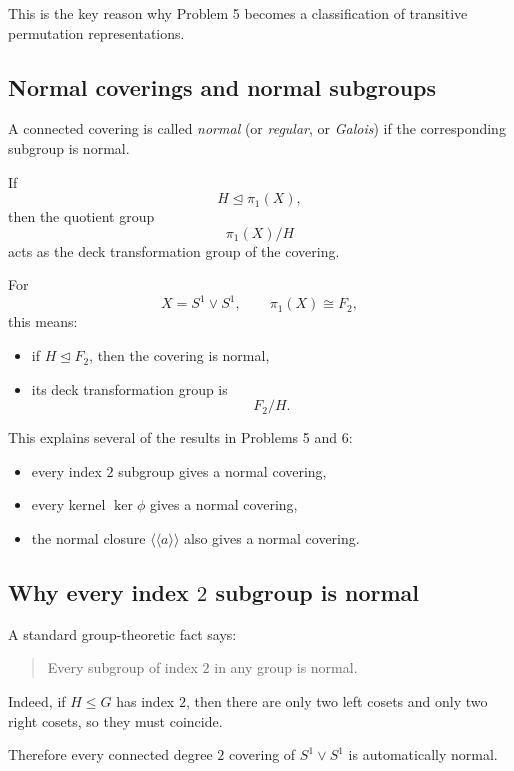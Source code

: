 \documentclass[12pt,a4paper]{article}
\theoremstyle{notespace}
\begin{document}
This is the key reason why Problem 5 becomes a classification of transitive permutation representations.

\bigskip

\subsection{Normal coverings and normal subgroups}

A connected covering is called \emph{normal} (or \emph{regular}, or \emph{Galois}) if the corresponding subgroup is normal.

If
\[
H\trianglelefteq \pi_1(X),
\]
then the quotient group
\[
\pi_1(X)/H
\]
acts as the deck transformation group of the covering.

For
\[
X=S^1\vee S^1,
\qquad
\pi_1(X)\cong F_2,
\]
this means:
\begin{itemize}
	\item if \(H\trianglelefteq F_2\), then the covering is normal,
	\item its deck transformation group is
	\[
	F_2/H.
	\]
\end{itemize}

This explains several of the results in Problems 5 and 6:
\begin{itemize}
	\item every index \(2\) subgroup gives a normal covering,
	\item every kernel \(\ker\phi\) gives a normal covering,
	\item the normal closure \(\langle\!\langle a\rangle\!\rangle\) also gives a normal covering.
\end{itemize}

\bigskip

\subsection{Why every index \texorpdfstring{$2$}{2} subgroup is normal}

A standard group-theoretic fact says:
\begin{quote}
	Every subgroup of index \(2\) in any group is normal.
\end{quote}

Indeed, if \(H\leq G\) has index \(2\), then there are only two left cosets and only two right cosets, so they must coincide.

Therefore every connected degree \(2\) covering of \(S^1\vee S^1\) is automatically normal.
\end{document}
